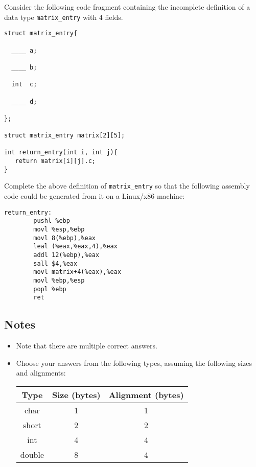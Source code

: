 \begin{problem}{6}

Consider the following code fragment containing the
incomplete definition of a data type {\tt matrix\_entry} 
with 4 fields.

\begin{verbatim}
struct matrix_entry{

  ____ a;

  ____ b;

  int  c;

  ____ d; 

};

struct matrix_entry matrix[2][5];

int return_entry(int i, int j){
   return matrix[i][j].c;
}

\end{verbatim}
Complete the above definition of {\tt matrix\_entry}
so that the following assembly code could be generated 
from it on a Linux/x86 machine:

\begin{verbatim}
return_entry:
        pushl %ebp
        movl %esp,%ebp
        movl 8(%ebp),%eax
        leal (%eax,%eax,4),%eax
        addl 12(%ebp),%eax
        sall $4,%eax
        movl matrix+4(%eax),%eax
        movl %ebp,%esp
        popl %ebp
        ret                             
\end{verbatim}         
\subsection*{Notes}
\begin{itemize}
\item Note that there are multiple correct answers.
\item Choose your answers from the following types, 
assuming the following sizes and alignments:
\begin{tabular}{|c||c|c|}
\hline
Type & Size (bytes) & Alignment (bytes) \\
\hline
\hline
char  & 1 & 1\\
short & 2 & 2\\
int   & 4 & 4\\
double& 8 & 4\\ 
\hline
\end{tabular}
\end{itemize}

\vspace{.5cm}
%



\end{problem}
